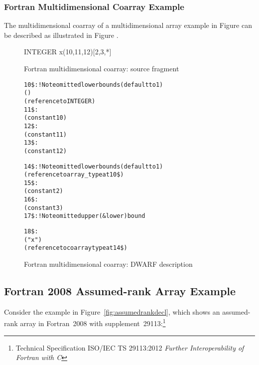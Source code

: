 \subsubsection{Fortran Multidimensional Coarray Example}
The  multidimensional coarray of a multidimensional array example
in Figure  can be described as 
illustrated in Figure .

\begin{figure}[ht]
\begin{nlnlisting}
        INTEGER x(10,11,12)[2,3,*]
\end{nlnlisting}
\caption{Fortran multidimensional coarray: source fragment}
\label{fig:Fortranmultidimensionalcoarraysourcefragment}
\end{figure}

\begin{figure}[ht]
\begin{dwflisting}
\begin{alltt}

10\$:  \DWTAGarraytype                ! Note omitted lower bounds (default to 1)
          \DWATordering(\DWORDcolmajor)
          \DWATtype(reference to INTEGER)
11\$:      \DWTAGsubrangetype
              \DWATupperbound(constant 10)
12\$:      \DWTAGsubrangetype
              \DWATupperbound(constant 11)
13\$:      \DWTAGsubrangetype
              \DWATupperbound(constant 12)

14\$:  \DWTAGcoarraytype              ! Note omitted lower bounds (default to 1)
          \DWATtype(reference to array_type at 10\$)
15\$:      \DWTAGsubrangetype
              \DWATupperbound(constant 2)
16\$:      \DWTAGsubrangetype
              \DWATupperbound(constant 3)
17\$:      \DWTAGsubrangetype         ! Note omitted upper (\& lower) bound

18\$:  \DWTAGvariable
          \DWATname("x")
          \DWATtype(reference to coarray type at 14\$)
        
\end{alltt}
\end{dwflisting}
\caption{Fortran multidimensional coarray: DWARF description}
\label{fig:FortranmultidimensionalcoarrayDWARFdescription}
\end{figure}


\clearpage
\subsection{Fortran 2008 Assumed-rank Array Example}
\label{app:assumedrankexample}
Consider the example in Figure~\ref{fig:assumedrankdecl}, which shows
an assumed-rank array in Fortran~2008 with
supplement~29113:\footnote{Technical Specification ISO/IEC TS
  29113:2012 \emph{Further Interoperability of Fortran with C}}

